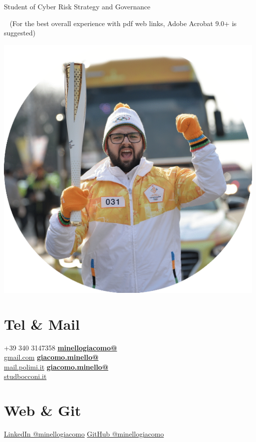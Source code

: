 \documentclass[]{friggeri-cv}
\begin{document}
       {\hspace{3,3cm} Student of Cyber Risk Strategy and Governance}
       
  
 

~
\scriptsize
{(For the best overall experience with pdf web links, Adobe Acrobat 9.0+ is suggested)} 


\normalsize
\begin{aside}
  \includegraphics[scale=0.11]{9912844.png}
  \section{Tel \& Mail}
    +39 340 3147358
    \href{mailto:minellogiacomo@gmail.com}{\textbf{minellogiacomo@}\\gmail.com}
    \href{mailto:giacomo.minello@mail.polimi.it}{\textbf{giacomo.minello@}\\mail.polimi.it}
    \href{mailto:giacomo.minello@studbocconi.it}{\textbf{giacomo.minello@}\\studbocconi.it}
    ~
\section{Web \& Git}
    \href{https://www.linkedin.com/in/minellogiacomo}{LinkedIn @minellogiacomo}
    \href{https://github.com/minellogiacomo}{GitHub @minellogiacomo} 
    ~

\end{aside}
\end{document}
